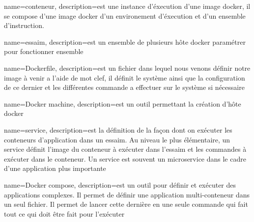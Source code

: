 {
  name={conteneur},
  description={est une instance d’éxecution d’une image docker, il se compose d’une image docker d’un environement d’éxecution et d’un ensemble d’instruction.}
}

{
  name={essaim},
  description={est un ensemble de plusieurs hôte docker paramétrer pour fonctionner ensemble}
}

{
  name={Dockerfile},
  description={est un fichier dans lequel nous venons définir notre image à venir  a l’aide de mot clef, il définit le système ainsi que la configuration de ce dernier et les différentes commande a effectuer sur le système si nécessaire }
}

{
  name=Docker machine,
  description={est un outil permettant la création d’hôte docker }
}

{
  name=service,
  description={est la définition de la façon dont on exécuter les conteneurs d'application dans un essaim. Au niveau le plus élémentaire, un service définit l'image du conteneur à exécuter dans l'essaim et les commandes à exécuter dans le conteneur. Un service est souvent un microservice dans le cadre d'une application plus importante}
}

{
  name=Docker compose,
  description={est un outil pour définir et exécuter des applications complexes. Il permet de définir  une application multi-conteneur dans un seul fichier. Il permet de lancer cette dernière en une seule commande qui fait tout ce qui doit être fait pour l'exécuter}
}
